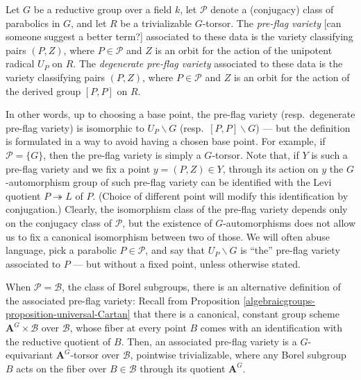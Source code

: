 \begin{definition}
 \label{definition-pre-flag}
Let $G$ be a reductive group over a field $k$, let $\mathcal P$ denote a (conjugacy) class of parabolics in $G$, and let $R$ be a trivializable $G$-torsor. The {\it pre-flag variety} [can someone suggest a better term?] associated to these data is the variety classifying pairs $(P, Z)$, where $P\in \mathcal P$ and $Z$ is an orbit for the action of the unipotent radical $U_P$ on $R$. The {\it degenerate pre-flag variety} associated to these data is the variety classifying pairs $(P, Z)$, where $P\in \mathcal P$ and $Z$ is an orbit for the action of the derived group $[P,P]$ on $R$.
\end{definition}

In other words, up to choosing a base point, the pre-flag variety (resp.\ degenerate pre-flag variety) is isomorphic to $U_P\backslash G$ (resp.\ $[P,P]\backslash G$) --- but the definition is formulated in a way to avoid having a chosen base point. For example, if $\mathcal P=\{G\}$, then the pre-flag variety is simply a $G$-torsor. Note that, if $Y$ is such a pre-flag variety and we fix a point $y = (P,Z)\in Y$, through its action on $y$ the $G$-automorphism group of such pre-flag variety can be identified with the Levi quotient $P\twoheadrightarrow L$ of $P$. (Choice of different point will modify this identification by conjugation.)
Clearly, the isomorphism class of the pre-flag variety depends only on the conjugacy class of $\mathcal P$, but the existence of $G$-automorphisms does not allow us to fix a canonical isomorphism between two of those. We will often abuse language, pick a parabolic $P \in \mathcal P$, and say that $U_P\backslash G$ is ``the'' pre-flag variety associated to $P$ --- but without a fixed point, unless otherwise stated.

\begin{remark}
\label{remark-preflag-Borel}
When $\mathcal P = \mathcal B$, the class of Borel subgroups, there is an alternative definition of the associated pre-flag variety: Recall from Proposition \ref{algebraicgroups-proposition-universal-Cartan} that there is a canonical, constant group scheme $\mathbf A^G\times \mathcal B$ over $\mathcal B$, whose fiber at every point $B$ comes with an identification with the reductive quotient of $B$. Then, an associated pre-flag variety is a $G$-equivariant $\mathbf A^G$-torsor over $\mathcal B$, pointwise trivializable, where any Borel subgroup $B$ acts on the fiber over $B\in \mathcal B$ through its quotient $\mathbf A^G$. 
\end{remark}


